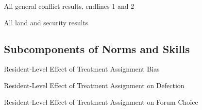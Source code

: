 \documentclass[10pt]{article}
\begin{document}
\begin{table}[H]
\caption{All general conflict results, endlines 1 and 2}
\begin{center}
\begin{adjustbox}{max width = \textwidth}

\end{adjustbox}
\end{center}
\end{table}

\begin{table}[H]
\caption{All land and security results}
\begin{center}
\begin{adjustbox}{max width = \textwidth}

\end{adjustbox}
\end{center}
\end{table}



\subsection{Subcomponents of Norms and Skills}

\begin{table}[H]
\caption{Resident-Level Effect of Treatment Assignment Bias}
\begin{center}
\begin{adjustbox}{max width = \textwidth}

\end{adjustbox}
\end{center}
\end{table}

\begin{table}[H]
\caption{Resident-Level Effect of Treatment Assignment on Defection}
\begin{center}
\begin{adjustbox}{max width = \textwidth}

\end{adjustbox}
\end{center}
\end{table}

\begin{table}[H]
\caption{Resident-Level Effect of Treatment Assignment on Forum Choice}
\begin{center}

\end{center}
\end{table}
\end{document}
